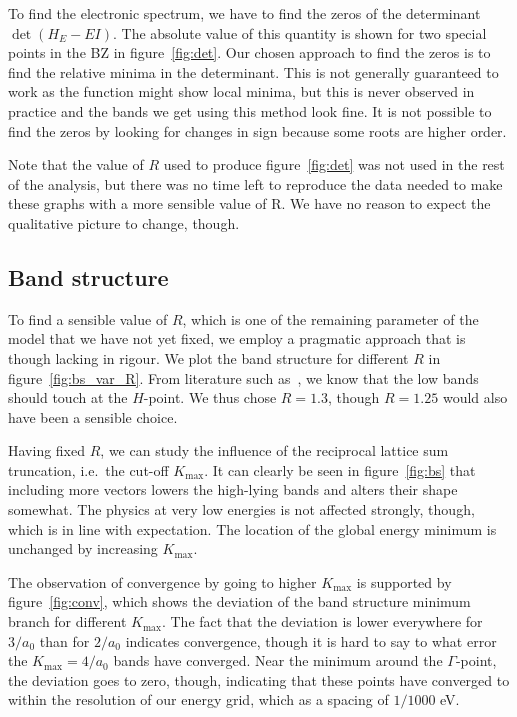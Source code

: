 \documentclass[a4paper,DIV=12,english]{scrartcl}
\begin{document}
To find the electronic spectrum, we have to find the zeros of the determinant $\det(H_E - EI)$. The absolute value of this quantity is shown for two special points in the BZ in figure~\ref{fig:det}. Our chosen approach to find the zeros is to find the relative minima in the determinant. This is not generally guaranteed to work as the function might show local minima, but this is never observed in practice and the bands we get using this method look fine. It is not possible to find the zeros by looking for changes in sign because some roots are higher order.

Note that the value of $R$ used to produce figure~\ref{fig:det} was not used in the rest of the analysis, but there was no time left to reproduce the data needed to make these graphs with a more sensible value of R. We have no reason to expect the qualitative picture to change, though.

\FloatBarrier
\subsection{Band structure}
To find a sensible value of $R$, which is one of the remaining parameter of the model that we have not yet fixed, we employ a pragmatic approach that is though lacking in rigour. We plot the band structure for different $R$ in figure~\ref{fig:bs_var_R}. From literature such as~\cite{perdew_li}, we know that the low bands should touch at the $H$-point. We thus chose $R=1.3$, though $R=1.25$ would also have been a sensible choice.

Having fixed $R$, we can study the influence of the reciprocal lattice sum truncation, i.e.\ the cut-off $K_\text{max}$. It can clearly be seen in figure~\ref{fig:bs} that including more vectors lowers the high-lying bands and alters their shape somewhat. The physics at very low energies is not affected strongly, though, which is in line with expectation. The location of the global energy minimum is unchanged by increasing $K_\text{max}$.

The observation of convergence by going to higher $K_\text{max}$ is supported by figure~\ref{fig:conv}, which shows the deviation of the band structure minimum branch for different $K_\text{max}$. The fact that the deviation is lower everywhere for $3/a_0$ than for $2/a_0$ indicates convergence, though it is hard to say to what error the $K_\text{max} = 4/a_0$ bands have converged. Near the minimum around the $\Gamma$-point, the deviation goes to zero, though, indicating that these points have converged to within the resolution of our energy grid, which as a spacing of $1/1000$ eV.
\end{document}
